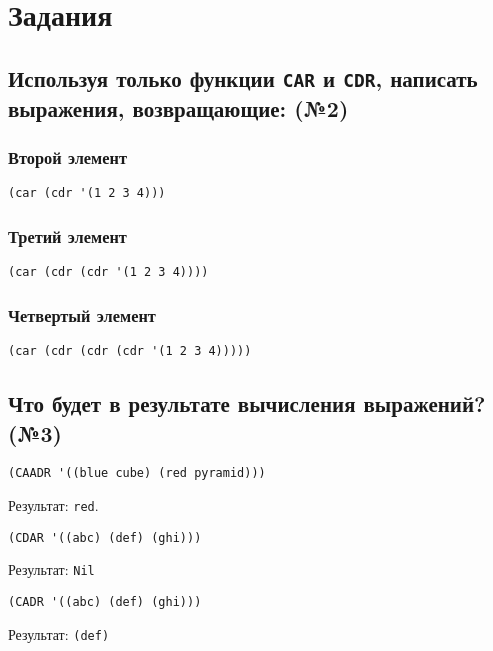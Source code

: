 \chapter{Задания}

\section{Используя только функции \texttt{CAR} и \texttt{CDR}, написать выражения, возвращающие: (№2)}

\subsection{Второй элемент}

\begin{lstlisting}
(car (cdr '(1 2 3 4)))
\end{lstlisting}

\subsection{Третий элемент}

\begin{lstlisting}
(car (cdr (cdr '(1 2 3 4))))
\end{lstlisting}

\subsection{Четвертый элемент}

\begin{lstlisting}
(car (cdr (cdr (cdr '(1 2 3 4)))))
\end{lstlisting}

\section{Что будет в результате вычисления выражений? (№3)}

\begin{lstlisting}
(CAADR '((blue cube) (red pyramid)))
\end{lstlisting}
Результат: \texttt{red}.
\vspace{20mm}

\begin{lstlisting}
(CDAR '((abc) (def) (ghi)))
\end{lstlisting}
Результат: \texttt{Nil}
\vspace{20mm}

\begin{lstlisting}
(CADR '((abc) (def) (ghi)))
\end{lstlisting}
Результат: \texttt{(def)}
\vspace{20mm}

